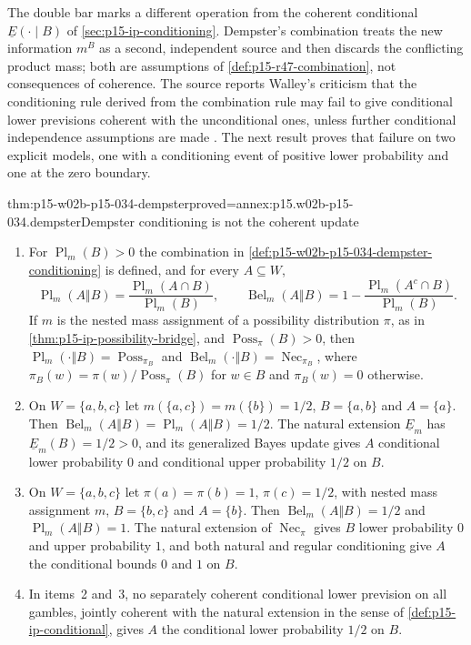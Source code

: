 The double bar marks a different operation from the coherent conditional
\(\underline E(\cdot\mid B)\) of \cref{sec:p15-ip-conditioning}. Dempster's
combination treats the new information \(m^B\) as a second, independent
source and then discards the conflicting product mass; both are assumptions
of \cref{def:p15-r47-combination}, not consequences of coherence. The source
reports Walley's criticism that the conditioning rule derived from the
combination rule may fail to give conditional lower previsions coherent with
the unconditional ones, unless further conditional independence assumptions
are made \cite[§5.5, p.~35]{MirandaCoherentLowerPrevisionsCapture}. The
next result proves that failure on two explicit models, one with a
conditioning event of positive lower probability and one at the zero
boundary.

\begin{hbtheorem}{thm:p15-w02b-p15-034-dempster}{proved=annex:p15.w02b-p15-034.dempster}{Dempster conditioning is not the coherent update}
\begin{enumerate}
\item For \(\operatorname{Pl}_m(B)>0\) the combination in
\cref{def:p15-w02b-p15-034-dempster-conditioning} is defined, and for every
\(A\subseteq W\),
\[
 \operatorname{Pl}_m(A\Vert B)=\frac{\operatorname{Pl}_m(A\cap B)}{\operatorname{Pl}_m(B)},
 \qquad
 \operatorname{Bel}_m(A\Vert B)=1-\frac{\operatorname{Pl}_m(A^c\cap B)}{\operatorname{Pl}_m(B)}.
\]
If \(m\) is the nested mass assignment of a possibility distribution
\(\pi\), as in \cref{thm:p15-ip-possibility-bridge}, and
\(\operatorname{Poss}_\pi(B)>0\), then
\(\operatorname{Pl}_m(\cdot\Vert B)=\operatorname{Poss}_{\pi_B}\) and
\(\operatorname{Bel}_m(\cdot\Vert B)=\operatorname{Nec}_{\pi_B}\), where
\(\pi_B(w)=\pi(w)/\operatorname{Poss}_\pi(B)\) for \(w\in B\) and
\(\pi_B(w)=0\) otherwise.
\item On \(W=\{a,b,c\}\) let \(m(\{a,c\})=m(\{b\})=1/2\), \(B=\{a,b\}\)
and \(A=\{a\}\). Then
\(\operatorname{Bel}_m(A\Vert B)=\operatorname{Pl}_m(A\Vert B)=1/2\).
The natural extension \(\underline E_m\) has \(\underline E_m(B)=1/2>0\),
and its generalized Bayes update gives \(A\) conditional lower probability
\(0\) and conditional upper probability \(1/2\) on \(B\).
\item On \(W=\{a,b,c\}\) let \(\pi(a)=\pi(b)=1\), \(\pi(c)=1/2\), with
nested mass assignment \(m\), \(B=\{b,c\}\) and \(A=\{b\}\). Then
\(\operatorname{Bel}_m(A\Vert B)=1/2\) and
\(\operatorname{Pl}_m(A\Vert B)=1\). The natural extension of
\(\operatorname{Nec}_\pi\) gives \(B\) lower probability \(0\) and upper
probability \(1\), and both natural and regular conditioning give \(A\)
the conditional bounds \(0\) and \(1\) on \(B\).
\item In items~2 and~3, no separately coherent conditional lower
prevision on all gambles, jointly coherent with the natural extension in the
sense of \cref{def:p15-ip-conditional}, gives \(A\) the conditional lower
probability \(1/2\) on \(B\).
\end{enumerate}
\end{hbtheorem}

